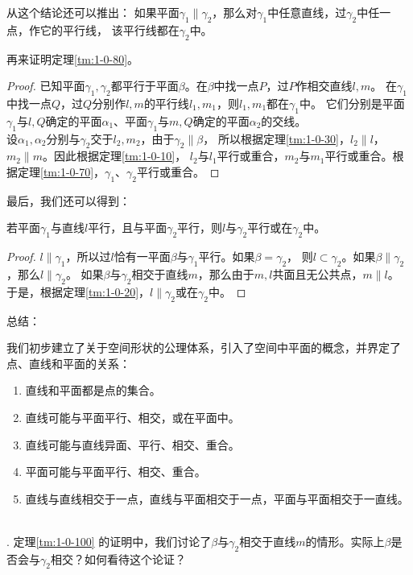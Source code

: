 \documentclass[12pt,UTF8]{ctexbook}
\begin{document}
从这个结论还可以推出：
如果平面$\gamma_1\parallel \gamma_2$，那么对$\gamma_1$中任意直线，过$\gamma_2$中任一点，作它的平行线，
该平行线都在$\gamma_2$中。

再来证明定理\ref{tm:1-0-80}。
\begin{proof}
    已知平面$\gamma_1,\gamma_2$都平行于平面$\beta$。在$\beta$中找一点$P$，过$P$作相交直线$l,m$。
    在$\gamma_1$中找一点$Q$，过$Q$分别作$l,m$的平行线$l_1,m_1$，则$l_1,m_1$都在$\gamma_1$中。
    它们分别是平面$\gamma_1$与$l,Q$确定的平面$\alpha_1$、平面$\gamma_1$与$m,Q$确定的平面$\alpha_2$的交线。\\
    设$\alpha_1,\alpha_2$分别与$\gamma_2$交于$l_2,m_2$，由于$\gamma_2\parallel \beta$，
    所以根据定理\ref{tm:1-0-30}，$l_2\parallel l$，$m_2\parallel m$。因此根据定理\ref{tm:1-0-10}，
    $l_2$与$l_1$平行或重合，$m_2$与$m_1$平行或重合。根据定理\ref{tm:1-0-70}，$\gamma_1$、$\gamma_2$平行或重合。
\end{proof}

最后，我们还可以得到：
\begin{tm}\label{tm:1-0-100}
    若平面$\gamma_1$与直线$l$平行，且与平面$\gamma_2$平行，则$l$与$\gamma_2$平行或在$\gamma_2$中。
\end{tm}
\begin{proof}
    $l\parallel \gamma_1$，所以过$l$恰有一平面$\beta$与$\gamma_1$平行。如果$\beta=\gamma_2$，
    则$l\subset\gamma_2$。如果$\beta\parallel\gamma_2$，那么$l\parallel \gamma_2$。
    如果$\beta$与$\gamma_2$相交于直线$m$，那么由于$m,l$共面且无公共点，$m\parallel l$。
    于是，根据定理\ref{tm:1-0-20}，$l\parallel \gamma_2$或在$\gamma_2$中。
\end{proof}

总结：

我们初步建立了关于空间形状的公理体系，引入了空间中平面的概念，并界定了点、直线和平面的关系：
\begin{enumerate}
    \item 直线和平面都是点的集合。
    \item 直线可能与平面平行、相交，或在平面中。
    \item 直线可能与直线异面、平行、相交、重合。
    \item 平面可能与平面平行、相交、重合。
    \item 直线与直线相交于一点，直线与平面相交于一点，平面与平面相交于一直线。
\end{enumerate}

\begin{sk}
    \mbox{} \\
    . 定理\ref{tm:1-0-100} 的证明中，我们讨论了$\beta$与$\gamma_2$相交于直线$m$的情形。实际上$\beta$是否会与$\gamma_2$相交？如何看待这个论证？
\end{sk}
\end{document}
